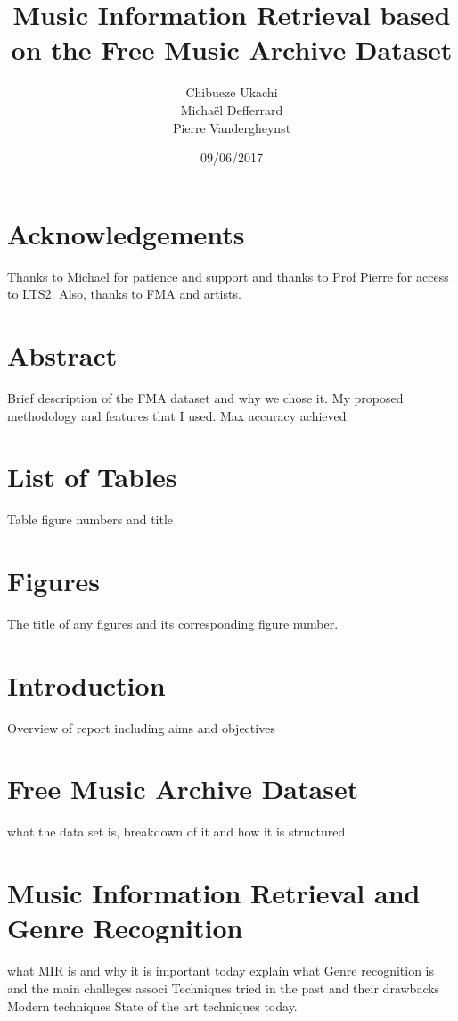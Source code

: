 \documentclass[11pt]{article}
\title{\textbf{Music Information Retrieval based on the Free Music Archive Dataset}}
\author{Chibueze Ukachi\\
		Micha\"el Defferrard\\
		Pierre Vandergheynst}
\date{09/06/2017}
\begin{document}
\maketitle
\newpage
\section*{Acknowledgements}
Thanks to Michael for patience and support and thanks to Prof Pierre for access to LTS2. Also, thanks to FMA and artists.

\newpage

\section*{Abstract}

Brief description of the FMA dataset and why we chose it. My proposed methodology and features that I used. Max accuracy achieved. 

\newpage

\section*{List of Tables}
Table figure numbers and title

\section*{Figures}
The title of any figures and its corresponding figure number. 
\newpage

\tableofcontents
\newpage

\section{Introduction}
Overview of report including aims and objectives
\newpage

\section{Free Music Archive Dataset}
what the data set is, breakdown of it and how it is structured
\newpage
\section{Music Information Retrieval and Genre Recognition}
what MIR is and why it is important today
explain what Genre recognition is and the main challeges associ
Techniques tried in the past and their drawbacks 
Modern techniques
State of the art techniques today. 
\newpage
\end{document}
